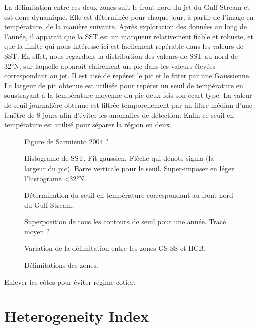\documentclass[index]{subfiles}
\begin{document}
La délimitation entre ces deux zones suit le front nord du jet du Gulf Stream et est donc dynamique. Elle est déterminée pour chaque jour, à partir de l'image en température, de la manière suivante.
Après exploration des données au long de l'année, il apparaît que la SST est un marqueur relativement fiable et robuste, et que la limite qui nous intéresse ici est facilement repérable dans les valeurs de SST.
En effet, nous regardons la distribution des valeurs de SST au nord de 32°N, sur laquelle apparaît clairement un pic dans les valeurs élevées correspondant au jet.
Il est aisé de repérer le pic et le fitter par une Gaussienne. La largeur de pic obtenue est utilisée pour repérer un seuil de température en soustrayant à la température moyenne du pic deux fois son écart-type.
La valeur de seuil journalière obtenue est filtrée temporellement par un filtre médian d'une fenêtre de 8 jours afin d'éviter les anomalies de détection.
Enfin ce seuil en température est utilisé pour séparer la région en deux.

\begin{figure}
  \caption{Figure de Sarmiento 2004 ?}
  \label{fig:sarmiento}
\end{figure}

\begin{figure}
  Histograme de SST. Fit gaussien. Flèche qui dénote sigma (la largeur du pic).
  Barre verticale pour le seuil.
  Super-imposer en léger l'histograme <32°N.
  \caption{Détermination du seuil en température correspondant au front nord du Gulf Stream.}
  \label{fig:seuil-temp}
\end{figure}


\begin{figure}
  Superposition de tous les contours de seuil pour une année.
  Tracé moyen ?
  \caption{Variation de la délimitation entre les zones GS-SS et HCB.}
  \label{fig:var-delim}
\end{figure}


\begin{figure}
  \caption{Délimitations des zones.}
  \label{fig:zone-delimitation}
\end{figure}

Enlever les côtes pour éviter régime cotier.

\section{Heterogeneity Index}
\label{sec:HI}
\end{document}
